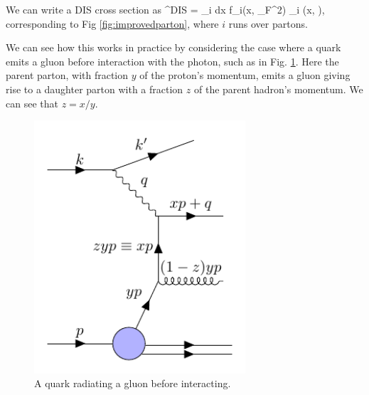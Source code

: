 We can write a DIS cross section as
\be
\label{eqn:disfact}
\sigma^{DIS} = \sum_i \int dx f_i(x, \mu_F^2) \hat{\sigma}_i \bigg(x,  \bigg),
\ee
corresponding to Fig \ref{fig:improvedparton}, where $i$ runs over partons.

We can see how this works in practice by considering the case where a quark emits a gluon before interaction with the photon, such as in Fig. \ref{fig:scalingviolation}. Here the parent parton, with fraction $y$ of the proton's momentum, emits a gluon giving rise to a daughter parton with a fraction $z$ of the parent hadron's momentum. We can see that $z = x/y$.

\begin{figure}[H]
\centering
\includegraphics[width=0.7\textwidth]{../diagrams/scalingviolation.pdf}
\caption{\label{fig:scalingviolation} A quark radiating a gluon before interacting.}
\end{figure}

